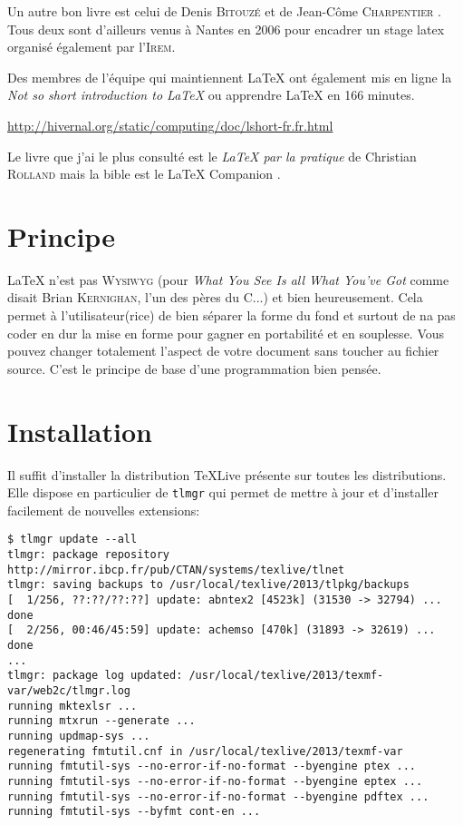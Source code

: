Un  autre  bon  livre  est  celui de  Denis  \textsc{Bitouzé}  et  de  Jean-Côme
\textsc{Charpentier} \citep{introductionLatex}. Tous deux sont d'ailleurs  venus à
Nantes  en  2006 pour  encadrer  un  stage  \gls{latex} organisé  également  par
l'\textsc{Irem}.

Des membres de l'équipe qui maintiennent  \LaTeX{} ont également mis en ligne la
\textit{Not so short introduction to \LaTeX{}} ou apprendre \LaTeX{} en 166 minutes.

\href{http://hivernal.org/static/computing/doc/lshort-fr.fr.html}{http://hivernal.org/static/computing/doc/lshort-fr.fr.html}


Le livre que j'ai  le plus consulté est le \textit{\LaTeX{}  par la pratique} de
Christian  \textsc{Rolland} \citep{rolland1999}  mais la  \og bible\fg{}  est le
\LaTeX{} Companion \citep{companionfr}.







\section{Principe}

\LaTeX{}  n'est pas  \textsc{Wysiwyg} (pour  \textit{What  You See  Is all  What
  You've Got} comme disait Brian \textsc{Kernighan},  l'un des pères du C...) et
bien heureusement. Cela permet à l'utilisateur(rice) de bien séparer la forme du
fond et surtout de na pas coder \og  en dur\fg{} la mise en forme pour gagner en
portabilité et  en souplesse. Vous  pouvez changer totalement l'aspect  de votre
document sans toucher  au fichier source. C'est le principe  de base d'une 
programmation bien pensée.






\section{Installation}

Il  suffit  d'installer  la  distribution \TeX{}Live  présente  sur  toutes  les
distributions.  Elle dispose  en  particulier de  \texttt{tlmgr}  qui permet  de
mettre à jour et d'installer facilement de nouvelles extensions:


\shell

\begin{lstlisting}
$ tlmgr update --all
tlmgr: package repository http://mirror.ibcp.fr/pub/CTAN/systems/texlive/tlnet
tlmgr: saving backups to /usr/local/texlive/2013/tlpkg/backups
[  1/256, ??:??/??:??] update: abntex2 [4523k] (31530 -> 32794) ... done
[  2/256, 00:46/45:59] update: achemso [470k] (31893 -> 32619) ... done
...
tlmgr: package log updated: /usr/local/texlive/2013/texmf-var/web2c/tlmgr.log
running mktexlsr ...
running mtxrun --generate ...
running updmap-sys ...
regenerating fmtutil.cnf in /usr/local/texlive/2013/texmf-var
running fmtutil-sys --no-error-if-no-format --byengine ptex ...
running fmtutil-sys --no-error-if-no-format --byengine eptex ...
running fmtutil-sys --no-error-if-no-format --byengine pdftex ...
running fmtutil-sys --byfmt cont-en ...
\end{lstlisting}


